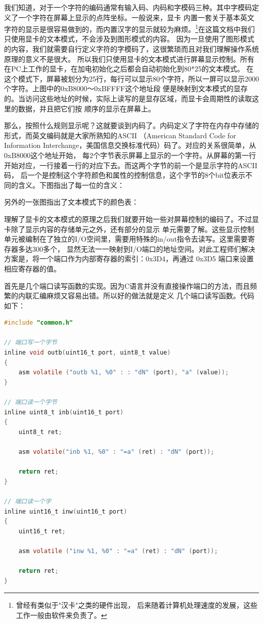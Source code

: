 \par 我们知道，对于一个字符的编码通常有输入码、内码和字模码三种。其中字模码定义了一个字符在屏幕上显示的点阵坐标。一般说来，显卡\allowbreak
内置一套关于基本英文字符的显示是很容易做到的，而内置汉字的显示就较为麻烦。\footnote{曾经有类似于"汉卡"之类的硬件出现，\allowbreak
后来随着计算机处理速度的发展，这些工作一般由软件来负责了。}在这篇文档中我们只使用显卡的文本模式，不会涉及到图形模式的内容。\allowbreak
因为一旦使用了图形模式的内容，我们就需要自行定义字符的字模码了，这很繁琐而且对我们理解操作系统原理的意义不是很大。\allowbreak
所以我们只使用显卡的文本模式进行屏幕显示控制。所有在PC上工作的显卡，在加电初始化之后都会自动初始化到80*25的文本模式。\allowbreak
在这个模式下，屏幕被划分为25行，每行可以显示80个字符，所以一屏可以显示2000个字符。上图中的0xB8000～0xBFFFF这个地址段\allowbreak
便是映射到文本模式的显存的。当访问这些地址的时候，实际上读写的是显存区域，而显卡会周期性的读取这里的数据，并且把它们按\allowbreak
顺序的显示在屏幕上。

\par 那么，按照什么规则显示呢？这就要谈到内码了。内码定义了字符在内存中存储的形式，而英文编码就是大家所熟知的ASCII\allowbreak
（American Standard Code for Information Interchange，美国信息交换标准代码）码了。对应的关系很简单，从0xB8000这个地址开始，\allowbreak
每2个字节表示屏幕上显示的一个字符。从屏幕的第一行开始对应，一行接着一行的对应下去。而这两个字节的前一个是显示字符的ASCII码，\allowbreak
后一个是控制这个字符颜色和属性的控制信息，这个字节的8个bit位表示不同的含义。下图指出了每一位的含义：

\par 另外的一张图指出了文本模式下的颜色表：

\par 理解了显卡的文本模式的原理之后我们就要开始一些对屏幕控制的编码了。不过显卡除了显示内容的存储单元之外，还有部分的显示\allowbreak
单元需要了解。这些显示控制单元被编制在了独立的I/O空间里，需要用特殊的in/out指令去读写。这里需要寄存器多达300多个，\allowbreak
显然无法一一映射到I/O端口的地址空间。对此工程师们解决方案是，将一个端口作为内部寄存器的索引：0x3D4，再通过 0x3D5\allowbreak
端口来设置相应寄存器的值。

\par 首先是几个端口读写函数的实现。因为C语言并没有直接操作端口的方法，而且频繁的内联汇编麻烦又容易出错。所以好的做法就是定义\allowbreak
几个端口读写函数。代码如下：

\begin{lstlisting}[language = C, label = libs/common.c, caption = libs/common.c]
#include "common.h"

// 端口写一个字节
inline void outb(uint16_t port, uint8_t value)
{
	asm volatile ("outb %1, %0" : : "dN" (port), "a" (value));
}

// 端口读一个字节
inline uint8_t inb(uint16_t port)
{
	uint8_t ret;

	asm volatile("inb %1, %0" : "=a" (ret) : "dN" (port));

	return ret;
}

// 端口读一个字
inline uint16_t inw(uint16_t port)
{
	uint16_t ret;

	asm volatile ("inw %1, %0" : "=a" (ret) : "dN" (port));

	return ret;
}
\end{lstlisting}

